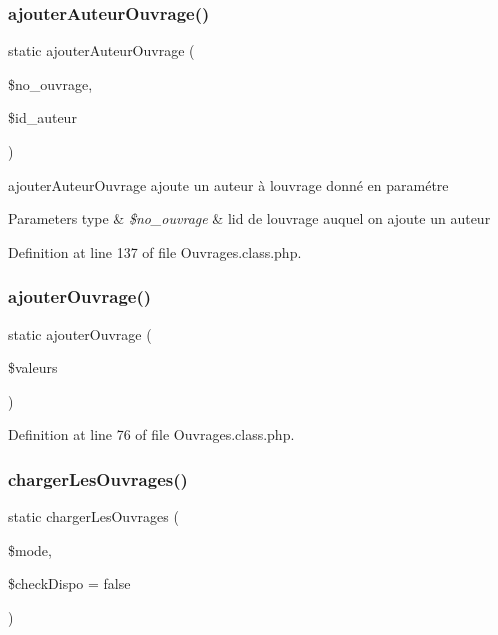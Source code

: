 \subsubsection{\texorpdfstring{ajouter\+Auteur\+Ouvrage()}{ajouterAuteurOuvrage()}}
{\footnotesize\ttfamily static ajouter\+Auteur\+Ouvrage (\begin{DoxyParamCaption}\item[{}]{\$no\+\_\+ouvrage,  }\item[{}]{\$id\+\_\+auteur }\end{DoxyParamCaption})\hspace{0.3cm}{\ttfamily [static]}}

ajouter\+Auteur\+Ouvrage ajoute un auteur à l\textquotesingle{}ouvrage donné en paramétre 
\begin{DoxyParams}[1]{Parameters}
type & {\em \$no\+\_\+ouvrage} & l\textquotesingle{}id de l\textquotesingle{}ouvrage auquel on ajoute un auteur \\
\hline
\end{DoxyParams}


Definition at line 137 of file Ouvrages.\+class.\+php.

\mbox{\label{class_ouvrages_ad36026065aaca6cac63ef4e66262f308}} 
\subsubsection{\texorpdfstring{ajouter\+Ouvrage()}{ajouterOuvrage()}}
{\footnotesize\ttfamily static ajouter\+Ouvrage (\begin{DoxyParamCaption}\item[{}]{\$valeurs }\end{DoxyParamCaption})\hspace{0.3cm}{\ttfamily [static]}}



Definition at line 76 of file Ouvrages.\+class.\+php.

\mbox{\label{class_ouvrages_af2c4af387fa3e2e41edda17d792dfc96}} 
\subsubsection{\texorpdfstring{charger\+Les\+Ouvrages()}{chargerLesOuvrages()}}
{\footnotesize\ttfamily static charger\+Les\+Ouvrages (\begin{DoxyParamCaption}\item[{}]{\$mode,  }\item[{}]{\$check\+Dispo = {\ttfamily false} }\end{DoxyParamCaption})\hspace{0.3cm}{\ttfamily [static]}}

